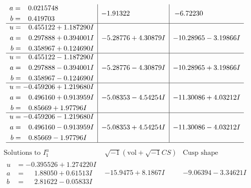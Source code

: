 \documentclass[1p]{elsarticle_modified}
\theoremstyle{definition}
\newcommand{\I}{\sqrt{-1}}
\begin{document}
$$\begin{array}{c|c|c}
\begin{aligned}
a &= \phantom{-}0.0215748\phantom{ +0.000000I} \\
b &= \phantom{-}0.419703\phantom{ +0.000000I}\end{aligned}
 & -1.91322\phantom{ +0.000000I} & -6.72230\phantom{ +0.000000I} \\ \hline\begin{aligned}
u &= \phantom{-}0.455122 + 1.187290 I \\
a &= \phantom{-}0.297888 + 0.394001 I \\
b &= \phantom{-}0.358967 + 0.124690 I\end{aligned}
 & -5.28776 + 4.30879 I & -10.28965 - 3.19866 I \\ \hline\begin{aligned}
u &= \phantom{-}0.455122 - 1.187290 I \\
a &= \phantom{-}0.297888 - 0.394001 I \\
b &= \phantom{-}0.358967 - 0.124690 I\end{aligned}
 & -5.28776 - 4.30879 I & -10.28965 + 3.19866 I \\ \hline\begin{aligned}
u &= -0.459206 + 1.219680 I \\
a &= \phantom{-}0.496160 + 0.913959 I \\
b &= \phantom{-}0.85669 + 1.97796 I\end{aligned}
 & -5.08353 - 4.54254 I & -11.30086 + 4.03212 I \\ \hline\begin{aligned}
u &= -0.459206 - 1.219680 I \\
a &= \phantom{-}0.496160 - 0.913959 I \\
b &= \phantom{-}0.85669 - 1.97796 I\end{aligned}
 & -5.08353 + 4.54254 I & -11.30086 - 4.03212 I\\
 \hline 
 \end{array}$$\newpage$$\begin{array}{c|c|c}  
\text{Solutions to }I^u_{1}& \I (\text{vol} + \sqrt{-1}CS) & \text{Cusp shape}\\
 \hline 
\begin{aligned}
u &= -0.395526 + 1.274220 I \\
a &= \phantom{-}1.88050 + 0.61513 I \\
b &= \phantom{-}2.81622 - 0.05833 I\end{aligned}
 & -15.9475 + 8.1867 I & -9.06394 - 3.34621 I \\ \hline\begin{aligned}

\end{aligned}
\end{array}$$
\end{document}
